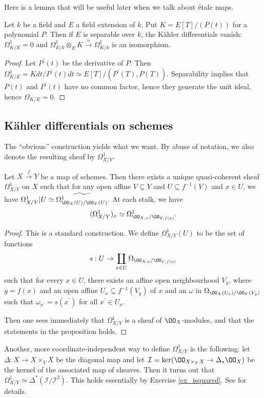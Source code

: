 \documentclass[11pt, english]{article}
\begin{document}
Here is a lemma that will be useful later when we talk about étale maps.
\begin{lemma}
Let $k$ be a field and $E$ a field extension of $k$. Put $K=E[T]/(P(t))$ for a polynomial $P$. Then if $E$ is separable over $k$, the Kähler differentials vanish: $\Omega_{K/E}^1=0$ and $\Omega^1_{E/k} \otimes_E K \xrightarrow{\simeq} \Omega_{K/k}^1$ is an isomorphism.
\end{lemma}
\begin{proof}
Let $P^\prime(t)$ be the derivative of $P$. Then $\Omega_{K/E} ^1 = K dt / P^\prime(t) dt \simeq E[T]/(P^\prime(T), P(T))$. Separability implies that $P(t)$ and $P^\prime(t)$ have no common factor, hence they generate the unit ideal, hence $\Omega_{K/E}=0$.
\end{proof}

\subsection{Kähler differentials on schemes}

The ``obvious'' construction yields what we want. By abuse of notation, we also denote the resulting sheaf by $\Omega_{X/Y}^1$. 

\begin{prop}
Let $X \xrightarrow{f}Y$ be a map of schemes. Then there exists a unique quasi-coherent sheaf $\Omega_{X/Y}^1$ on $X$ such that for any open affine $V \subseteq Y$ and $U \subseteq f^{-1}(V)$ and $x \in U$, we have $\Omega_{X/Y}^1{|U} \simeq \widetilde{\Omega_{\OO_X(U)/\OO_Y(U)}^1}$. At each stalk, we have
\[
(\Omega_{X/Y}^1)_x \simeq \Omega_{\OO_{X,x}/\OO_{Y,f(x)}}^1.
\]
\end{prop}

\begin{proof}
This is a standard construction. We define $\Omega_{X/Y}^1(U)$ to be the set of functions
\[
s:U \to \coprod_{x \in U} \Omega_{\OO_{X,x}/\OO_{Y,f(x)}}
\]
such that for every $x \in U$, there exists an affine open neighbourhood $V_y$, where $y=f(x)$ and an open affine $U_x \subseteq f^{-1}(V_y)$ of $x$ and an $\omega$ in $\Omega_{\OO_X(U_x)/\OO_Y(V_y)}$ such that $\omega_{x^\prime} = s(x^\prime)$ for all $x^\prime \in U_x$.

Then one sees immediately that $\Omega_{X/Y}^1$ is a sheaf of $\OO_X$-modules, and that the statements in the proposition holds. 
\end{proof}

Another, more coordinate-independent way to define $\Omega_{X/Y}^1$ is the following: let $\Delta:X \to X \times_Y X$ be the diagonal map and let $\mathcal I = \ker (\OO_{X \times_Y X} \to \Delta_\ast \OO_X)$ be the kernel of the associated map of sheaves. Then it turns out that $\Omega_{X/Y}^1 \simeq \Delta^\ast(\mathcal I/\mathcal I^2)$. This holds essentially by Exercise \ref{ex_isquared}. See \cite[Chapter II, §8]{hartshorne} for details.
\end{document}

